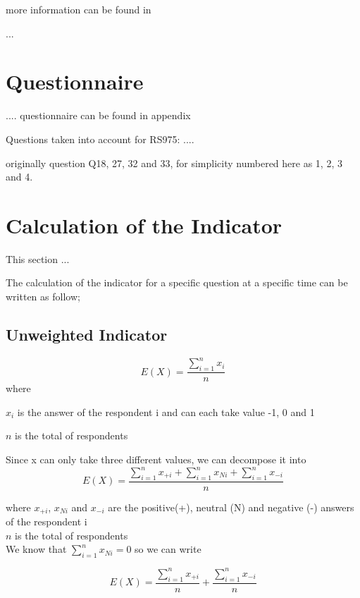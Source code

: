 \documentclass[12pt,a4paper,oneside]{book}
\begin{document}
more information can be found in \cite{de_greef_national_2009}



...

\section{Questionnaire}
.... questionnaire can be found in appendix %


Questions taken into account for RS975:
....

originally question Q18, 27, 32 and 33, for simplicity numbered here as 1, 2, 3 and 4.




\section{Calculation of the Indicator}

This section ...

The calculation of the indicator for a specific question at a specific time can be written as follow;

\subsection{Unweighted Indicator}

\begin{equation}
    E(X) = \frac{ \sum_{i=1}^n x_i}{n}
\end{equation} 
where 

$x_i$ is the answer of the respondent i and can each take value -1, 0 and 1 

$n$ is the total of respondents

Since x can only take three different values, we can decompose it into 
\begin{equation}
    E(X) = \frac{ \sum_{i=1}^n x_{+i} + \sum_{i=1}^n x_{Ni} + \sum_{i=1}^n x_{-i}}{n}
\end{equation} 

where 
$x_{+i}$, $x_{Ni}$ and $x_{-i}$ are the positive(+), neutral (N) and negative (-) answers of the respondent i \\
$n$ is the total of respondents\\

We know that $\sum_{i=1}^n x_{Ni} = 0$ so we can write

\begin{equation}
    E(X) = \frac{\sum_{i=1}^n x_{+i}}{n}  + \frac{\sum_{i=1}^n x_{-i}}{n}
\end{equation} 
\end{document}
